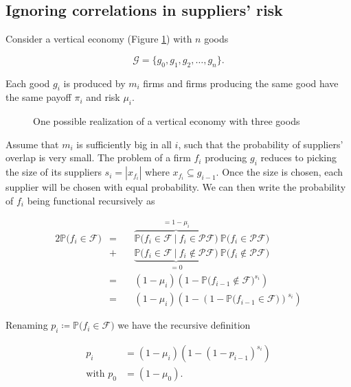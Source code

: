 \documentclass[american, abstract=on]{scrartcl}
\newcommand{\inputTikZ}[2]{%
      \scalebox{#1}{}  
    }
\newcommand{\F}{\mathcal{F}}
\newcommand{\G}{\mathcal{G}}
\newcommand{\PF}{\mathcal{P} \F}
\renewcommand{\P}{\mathbb{P}}
\newcommand{\abs}[1]{\left\lvert#1\right\rvert}
\begin{document}
\subsection{Ignoring correlations in suppliers' risk} \label{sec:vertical:ignoring}

Consider a vertical economy (Figure \ref{fig:vertical}) with $n$ goods

\begin{equation}
  \G = \{g_0, g_1, g_2, \ldots, g_n\}.
\end{equation}

Each good $g_i$ is produced by $m_i$ firms and firms producing the same good have the same payoff $\pi_i$ and risk $\mu_i$.

\begin{figure}[H]
  \centering
  \inputTikZ{0.7}{diagrams/vertical-economy.tikz} 
  \caption{One possible realization of a vertical economy with three goods}
  \label{fig:vertical}
\end{figure}

Assume that $m_{i}$ is sufficiently big in all $i$, such that the probability of suppliers' overlap is very small. The problem of a firm $f_i$ producing $g_i$ reduces to picking the size of its suppliers $s_i = \abs{x_{f_i}}$ where $x_{f_i} \subseteq g_{i - 1}$. Once the size is chosen, each supplier will be chosen with equal probability. We can then write the probability of $f_i$ being functional recursively as

\begin{alignat*}{2}
  \P\Big( f_i \in \F \Big) &= \ &&\overbrace{\P\Big( f_i \in \F \ \vert \ f_i \in \PF \Big)}^{= 1 - \mu_i} \ \P\Big( f_i \in \PF \Big) \\
  &+ &&\underbrace{\P\Big( f_i \in \F \ \vert \ f_i \notin \PF \Big)}_{= 0} \  \P\Big( f_i \notin \PF \Big) \\
  &= &&(1 - \mu_i) \left( 1 - \P\Big( f_{i-1} \notin \F \Big)^{s_i} \right) \\
  &= &&(1 - \mu_i) \left( 1 - \left(1 - \P\Big( f_{i-1} \in \F \Big)\right)^{s_i} \right)
\end{alignat*}

Renaming $p_i \coloneqq \P\Big( f_i \in \F \Big)$ we have the recursive definition

\begin{equation}
  \begin{split}
    p_{i} &= (1 - \mu_i) \left( 1 - (1 - p_{i-1})^{s_i} \right) \\
    \text{with } p_0 &= (1 - \mu_0).
  \end{split}
\end{equation}
\end{document}
